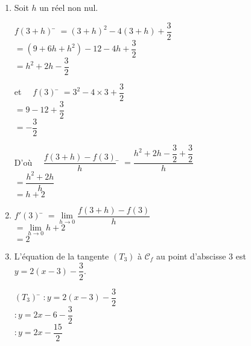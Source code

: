 \documentclass[a4paper,11pt,exos]{nsi}
\begin{document}
\textcolor{UGLiBlue}{
    \begin{enumerate}
        \item Soit $h$ un réel non nul.
        \begin{multicols}{2}
            \begin{tabbing}
                $f(3+h)$ \= $=(3+h)^2-4(3+h)+\dfrac{3}{2}$\\
                \> $= (9+6h+h^2)-12-4h+\dfrac{3}{2}$\\
                \> $= h^2+2h-\dfrac{3}{2}$   
            \end{tabbing}
            \begin{tabbing}
                et $\quad f(3)$ \= $=3^2-4\times 3+\dfrac{3}{2}$\\
                \> $=9-12+\dfrac{3}{2}$\\
                \> $=-\dfrac{3}{2}$
            \end{tabbing}
        \end{multicols}
        \begin{tabbing}
            D'où $\quad \dfrac{f(3+h)-f(3)}{h}$ \= $= \dfrac{h^2+2h-\dfrac{3}{2}+\dfrac{3}{2}}{h}$\\
            \> $= \dfrac{h^2+2h}{h}$\\
            \> $= h+2$
        \end{tabbing}
        \item \begin{tabbing}
            $f'(3)$ \= $= \lim\limits_{h\to 0} \dfrac{f(3+h)-f(3)}{h}$\\[.5em]
            \> $= \lim\limits_{h\to 0} h+2$\\[.5em]
            \> $= 2$
        \end{tabbing}
        \item L'équation de la tangente $(T_3)$ à $\mathcal{C}_f$ au point d'abscisse 3 est $y=2(x-3)-\dfrac{3}{2}$.
        \begin{tabbing}
            $(T_3)$ \= $: y=2(x-3)-\dfrac{3}{2}$\\[.5em]
            \> $: y=2x-6-\dfrac{3}{2}$\\[.5em]
            \> $: y=2x-\dfrac{15}{2}$
        \end{tabbing}
    \end{enumerate}
}
\end{document}
